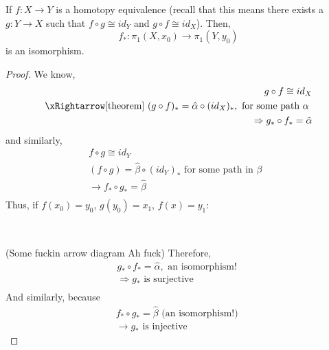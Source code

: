     \begin{corollary}
        If $f: X\rightarrow Y$ is a homotopy equivalence
        (recall that this means there exists a $g:Y\rightarrow X$ such that 
        $f\circ g\cong id_Y$ and $g\circ f\cong id_X$). Then,
        \[
            f_*: \pi_1(X,x_0)\rightarrow \pi_1(Y,y_0)
        \]
        is an isomorphism.
        \begin{proof}
            We know,
            \begin{align*}
                g\circ f \cong id_X\\
                \xRightarrow[\text{theorem}]\ (g\circ f)_*
                =\hat{\alpha}\circ (id_X)_*, \text{ for some path $\alpha $ }\\
                \Rightarrow g_*\circ f_* = \hat{\alpha}\\
            \end{align*}
            and similarly,
            \begin{align*}
                f\circ g\cong id_Y\\
                (f\circ g) = \hat{\beta}\circ (id_Y)_* \text{ for some path in $\beta $ }\\
                \rightarrow f_* \circ g_* = \hat{\beta}\\
            \end{align*}
            Thus, if $f(x_0)=y_0$, $g(y_0)=x_1$, $f(x)=y_1$:\\
            \begin{center}
                \\
            \end{center}
            (Some fuckin arrow diagram Ah fuck)
            Therefore,
            \begin{align*}
                g_*\circ f_* = \hat{\alpha}, \text{ an isomorphism! }\\
                \Rightarrow g_* \text{ is surjective}\\
            \end{align*}
            And similarly, because
            \begin{align*}
                f_*\circ g_* = \hat{\beta} \text{ (an isomorphism!) }\\
                \rightarrow g_* \text{ is injective}
            \end{align*}
        \end{proof}
    \end{corollary}
